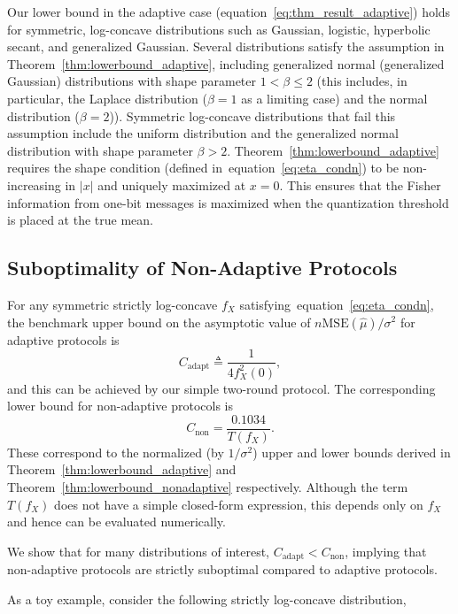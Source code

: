 \documentclass[10pt]{article} %
\def\eqref#1{equation~\ref{#1}}
\theoremstyle{plain}
\theoremstyle{definition}
\theoremstyle{remark}
\begin{document}
\par Our lower bound in the adaptive case (\eqref{eq:thm_result_adaptive}) holds for symmetric, log-concave distributions such as Gaussian, logistic, hyperbolic secant, and generalized Gaussian. Several distributions satisfy the assumption in Theorem~\ref{thm:lowerbound_adaptive}, including generalized normal (generalized Gaussian) distributions with shape parameter $1<\beta\le 2$ (this includes, in particular, the Laplace distribution ($\beta=1$ as a limiting case) and the normal distribution ($\beta=2$)). Symmetric log-concave distributions that fail this assumption include the uniform distribution and the generalized normal distribution with shape parameter $\beta>2$. Theorem~\ref{thm:lowerbound_adaptive} requires the shape condition (defined in~\eqref{eq:eta_condn}) to be non-increasing in $|x|$ and uniquely maximized at $x=0$. This ensures that the Fisher information from one-bit messages is maximized when the quantization threshold is placed at the true mean. 



\subsection{Suboptimality of Non-Adaptive Protocols}

For any symmetric strictly log-concave $f_X$ satisfying~\eqref{eq:eta_condn}, the benchmark upper bound on the asymptotic value of $n\mathrm{MSE}(\hat{\mu})/\sigma^2$ for adaptive protocols is
\[
 C_{\text{adapt}}\triangleq\frac{1}{4 f_X^2(0)},
\]
and this can be achieved by our simple two-round protocol.
The corresponding lower bound for non-adaptive protocols is
\[
C_{\text{non}} =  \frac{0.1034}{T(f_X)}.
\]
These correspond to the normalized (by $1/\sigma^2$) upper and lower bounds derived in Theorem~\ref{thm:lowerbound_adaptive} and Theorem~\ref{thm:lowerbound_nonadaptive} respectively.  Although the term $T(f_X)$ does not have a simple closed-form expression, this depends only on $f_X$ and hence can be evaluated numerically. 

We show that for many distributions of interest, 
$C_{\text{adapt}}<C_{\text{non}}$, implying that non-adaptive protocols are strictly suboptimal compared to adaptive protocols.

\par As a toy example, consider the following strictly log-concave distribution,
\end{document}
